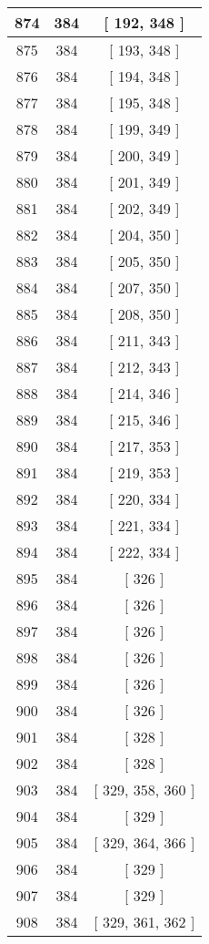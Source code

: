 \begin{center}
\begin{longtable}[H]{|| c c c ||}
\hline
874 & 384 & [ 192, 348 ] \\ 
\hline
875 & 384 & [ 193, 348 ] \\ 
\hline
876 & 384 & [ 194, 348 ] \\ 
\hline
877 & 384 & [ 195, 348 ] \\ 
\hline
878 & 384 & [ 199, 349 ] \\ 
\hline
879 & 384 & [ 200, 349 ] \\ 
\hline
880 & 384 & [ 201, 349 ] \\ 
\hline
881 & 384 & [ 202, 349 ] \\ 
\hline
882 & 384 & [ 204, 350 ] \\ 
\hline
883 & 384 & [ 205, 350 ] \\ 
\hline
884 & 384 & [ 207, 350 ] \\ 
\hline
885 & 384 & [ 208, 350 ] \\ 
\hline
886 & 384 & [ 211, 343 ] \\ 
\hline
887 & 384 & [ 212, 343 ] \\ 
\hline
888 & 384 & [ 214, 346 ] \\ 
\hline
889 & 384 & [ 215, 346 ] \\ 
\hline
890 & 384 & [ 217, 353 ] \\ 
\hline
891 & 384 & [ 219, 353 ] \\ 
\hline
892 & 384 & [ 220, 334 ] \\ 
\hline
893 & 384 & [ 221, 334 ] \\ 
\hline
894 & 384 & [ 222, 334 ] \\ 
\hline
895 & 384 & [ 326 ] \\ 
\hline
896 & 384 & [ 326 ] \\ 
\hline
897 & 384 & [ 326 ] \\ 
\hline
898 & 384 & [ 326 ] \\ 
\hline
899 & 384 & [ 326 ] \\ 
\hline
900 & 384 & [ 326 ] \\ 
\hline
901 & 384 & [ 328 ] \\ 
\hline
902 & 384 & [ 328 ] \\ 
\hline
903 & 384 & [ 329, 358, 360 ] \\ 
\hline
904 & 384 & [ 329 ] \\ 
\hline
905 & 384 & [ 329, 364, 366 ] \\ 
\hline
906 & 384 & [ 329 ] \\ 
\hline
907 & 384 & [ 329 ] \\ 
\hline
908 & 384 & [ 329, 361, 362 ] \\ 

\end{longtable}
\end{center}
